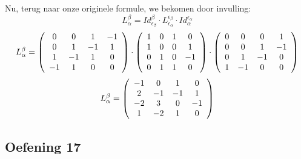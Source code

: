 \documentclass[lineaire_algebra_oplossingen.tex]{subfiles}
\begin{document}
Nu, terug naar onze originele formule, we bekomen door invulling:
\[
L^\beta_\alpha = Id^\beta_{\epsilon_\beta}\cdot L^{\epsilon_\beta}_{\epsilon_\alpha}\cdot Id^{\epsilon_\alpha}_{\alpha}
\]
\[L^\beta_\alpha = \left(
\begin{array}{c c c c}
0 & 0 & 1 & -1 \\ 
0 & 1 & -1 & 1 \\ 
1 & -1 & 1 & 0 \\ 
-1 & 1 & 0 & 0 \\ 
\end{array}
\right) \cdot \left(\begin{array}{c c c c}
1 & 0 & 1 & 0 \\ 
1 & 0 & 0 & 1 \\ 
0 & 1 & 0 & -1 \\ 
0 & 1 & 1 & 0 \\ 
\end{array}
\right) \cdot \left(
\begin{array}{c c c c}
0 & 0 & 0 & 1 \\ 
0 & 0 & 1 & -1 \\ 
0 & 1 & -1 & 0 \\ 
1 & -1 & 0 & 0 \\
\end{array}
\right)
\]
\[L^\beta_\alpha = \left(
\begin{array}{c c c c}
-1 & 0 & 1 & 0 \\ 
2 & -1 & -1 & 1 \\ 
-2 & 3 & 0 & -1 \\ 
1 & -2 & 1 & 0 \\
\end{array}
\right)
\]


\subsection{Oefening 17}
\end{document}
